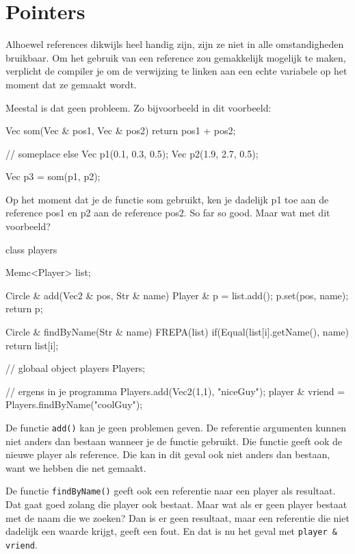 \chapter{Pointers}

Alhoewel references dikwijls heel handig zijn, zijn ze niet in alle omstandigheden bruikbaar. Om het gebruik van een reference zou gemakkelijk mogelijk te maken, verplicht de compiler je om de verwijzing te linken aan
een echte variabele op het moment dat ze gemaakt wordt.

Meestal is dat geen probleem. Zo bijvoorbeeld in dit voorbeeld:

\begin{code}
Vec som(Vec & pos1, Vec & pos2) {
  return pos1 + pos2;
}

// someplace else
Vec p1(0.1, 0.3, 0.5);
Vec p2(1.9, 2.7, 0.5);

Vec p3 = som(p1, p2); 
\end{code}

Op het moment dat je de functie som gebruikt, ken je dadelijk p1 toe aan de reference pos1 en p2 aan de reference pos2. So far so good. Maar wat met dit voorbeeld?

\begin{code}
class players {
  Memc<Player> list;
	
  Circle &  add(Vec2 & pos, Str & name) {
    Player & p = list.add();
    p.set(pos, name);
    return p;
  }	  

  Circle & findByName(Str & name) {
    FREPA(list) {
      if(Equal(list[i].getName(), name) {
        return list[i];
      }
    }
  }	
}
// globaal object
players Players;

// ergens in je programma 
Players.add(Vec2(1,1), "niceGuy");
player & vriend = Players.findByName("coolGuy");
\end{code}

De functie \texttt{add()} kan je geen problemen geven. De referentie argumenten kunnen niet anders dan bestaan wanneer je de functie gebruikt. Die functie geeft ook de nieuwe player als reference. Die kan in dit geval ook niet anders dan bestaan, want we hebben die net gemaakt.

De functie \texttt{findByName()} geeft ook een referentie naar een player als resultaat. Dat gaat goed zolang die player ook bestaat. Maar wat als er geen player bestaat met de naam die we zoeken? Dan is er geen resultaat, maar een referentie die niet dadelijk een waarde krijgt, geeft een fout. En dat is nu het geval met \texttt{player \& vriend}.

